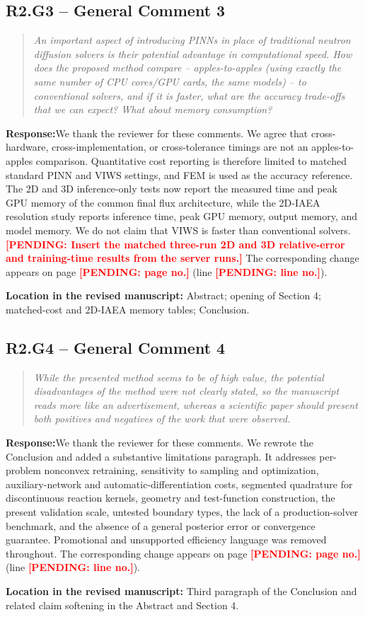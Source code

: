 \documentclass[11pt,a4paper]{article}
\newenvironment{reviewercomment}{\begin{quote}\small\itshape\color{commentgray}}{\end{quote}}
\newcommand{\authorresponse}{\noindent\textbf{Response:}\quad}
\newcommand{\revisionlocation}[1]{\par\noindent\textcolor{locationblue}{\textbf{Location in the revised manuscript: }}#1}
\newcommand{\draftplaceholder}[1]{\textcolor{red}{\textbf{[PENDING: #1]}}}
\begin{document}
\subsection*{R2.G3 -- General Comment 3}
\begin{reviewercomment}
An important aspect of introducing PINNs in place of traditional neutron diffusion solvers is their potential advantage in computational speed. How does the proposed method compare -- apples-to-apples (using exactly the same number of CPU cores/GPU cards, the same models) -- to conventional solvers, and if it is faster, what are the accuracy trade-offs that we can expect? What about memory consumption?
\end{reviewercomment}
\authorresponse We thank the reviewer for these comments. We agree that cross-hardware, cross-implementation, or cross-tolerance timings are not an apples-to-apples comparison. Quantitative cost reporting is therefore limited to matched standard PINN and VIWS settings, and FEM is used as the accuracy reference. The 2D and 3D inference-only tests now report the measured time and peak GPU memory of the common final flux architecture, while the 2D-IAEA resolution study reports inference time, peak GPU memory, output memory, and model memory. We do not claim that VIWS is faster than conventional solvers. \draftplaceholder{Insert the matched three-run 2D and 3D relative-error and training-time results from the server runs.}
The corresponding change appears on page \draftplaceholder{page no.} (line \draftplaceholder{line no.}).
\revisionlocation{Abstract; opening of Section 4; matched-cost and 2D-IAEA memory tables; Conclusion.}

\subsection*{R2.G4 -- General Comment 4}
\begin{reviewercomment}
While the presented method seems to be of high value, the potential disadvantages of the method were not clearly stated, so the manuscript reads more like an advertisement, whereas a scientific paper should present both positives and negatives of the work that were observed.
\end{reviewercomment}
\authorresponse We thank the reviewer for these comments. We rewrote the Conclusion and added a substantive limitations paragraph. It addresses per-problem nonconvex retraining, sensitivity to sampling and optimization, auxiliary-network and automatic-differentiation costs, segmented quadrature for discontinuous reaction kernels, geometry and test-function construction, the present validation scale, untested boundary types, the lack of a production-solver benchmark, and the absence of a general posterior error or convergence guarantee. Promotional and unsupported efficiency language was removed throughout. The corresponding change appears on page \draftplaceholder{page no.} (line \draftplaceholder{line no.}).
\revisionlocation{Third paragraph of the Conclusion and related claim softening in the Abstract and Section 4.}
\end{document}
